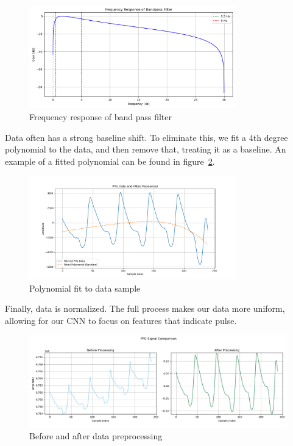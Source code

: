 \documentclass{article}
\begin{document}
\begin{figure}[H]
    \centering
    \includegraphics[width=0.8\textwidth]{../media/bpf.png}
    \caption{Frequency response of band pass filter}
    \label{fig:bpf}
\end{figure}

Data often has a strong baseline shift. To eliminate this, we fit a 4th degree polynomial to the data, and then remove that, treating it as a baseline. An example of a fitted polynomial can be found in figure~\ref{fig:poly}.

\begin{figure}[H]
    \centering
    \includegraphics[width=0.8\textwidth]{../media/poly.png}
    \caption{Polynomial fit to data sample}
    \label{fig:poly}
\end{figure}

Finally, data is normalized. The full process makes our data more uniform, allowing for our CNN to focus on features that indicate pulse.

\begin{figure}[H]
    \centering
    \includegraphics[width=1.0\textwidth]{../media/bef_n_aft.png}
    \caption{Before and after data preprocessing}
    \label{fig:bef_n_aft}
\end{figure}
\end{document}
